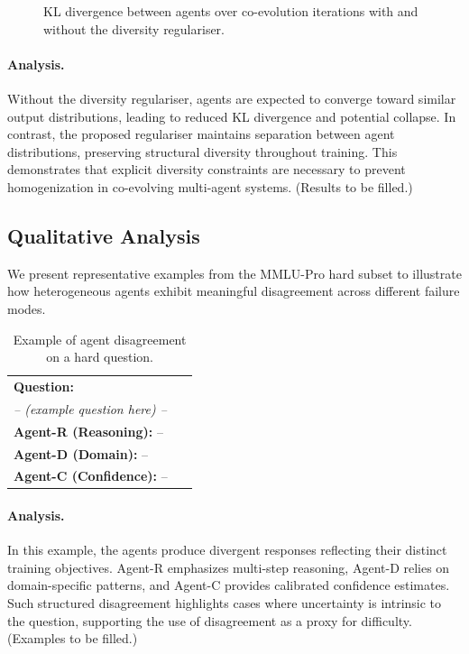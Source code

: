 \documentclass{article}
\begin{document}
\begin{figure}[h]
\centering
{}
\caption{KL divergence between agents over co-evolution iterations with and without the diversity regulariser.}
\label{fig:regulariser}
\end{figure}

\paragraph{Analysis.}
Without the diversity regulariser, agents are expected to converge toward similar output distributions, leading to reduced KL divergence and potential collapse. In contrast, the proposed regulariser maintains separation between agent distributions, preserving structural diversity throughout training. This demonstrates that explicit diversity constraints are necessary to prevent homogenization in co-evolving multi-agent systems. (Results to be filled.)

\subsection{Qualitative Analysis}

We present representative examples from the MMLU-Pro hard subset to illustrate how heterogeneous agents exhibit meaningful disagreement across different failure modes.

\begin{table}[h]
\centering
\caption{Example of agent disagreement on a hard question.}
\label{tab:qualitative}
\begin{tabular}{p{0.9\linewidth}}
\toprule
\textbf{Question:} \\
\textit{-- (example question here) --} \\
\midrule
\textbf{Agent-R (Reasoning):} -- \\
\textbf{Agent-D (Domain):} -- \\
\textbf{Agent-C (Confidence):} -- \\
\bottomrule
\end{tabular}
\end{table}

\paragraph{Analysis.}
In this example, the agents produce divergent responses reflecting their distinct training objectives. Agent-R emphasizes multi-step reasoning, Agent-D relies on domain-specific patterns, and Agent-C provides calibrated confidence estimates. Such structured disagreement highlights cases where uncertainty is intrinsic to the question, supporting the use of disagreement as a proxy for difficulty. (Examples to be filled.)
\end{document}
